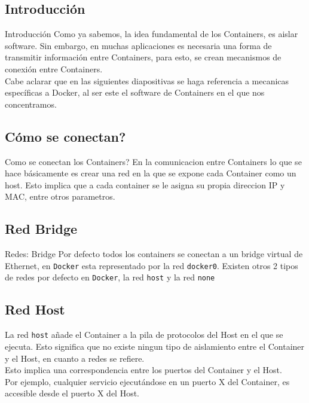 \documentclass{beamer}
\begin{document}
\subsection{Introducción}

\begin{frame}{Introducción}
	Como ya sabemos, la idea fundamental de los Containers, es aislar software. Sin embargo, en muchas aplicaciones es necesaria una forma de transmitir información entre Containers, para esto, se crean mecanismos de conexión entre Containers. \\Cabe aclarar que en las siguientes diapositivas se haga referencia a mecanicas específicas a Docker, al ser este el software de Containers en el que nos concentramos.
\end{frame}

\subsection{Cómo se conectan?}
\begin{frame}{Como se conectan los Containers?}
	En la comunicacion entre Containers lo que se hace básicamente es crear una red en la que se expone cada Container como un host. Esto implica que a cada container se le asigna su propia direccion IP y MAC, entre otros parametros.
\end{frame}

\subsection{Red Bridge}
\begin{frame}{Redes: Bridge}
Por defecto todos los containers se conectan a un bridge virtual de Ethernet, en \texttt{Docker} esta representado por la red \texttt{docker0}. Existen otros 2 tipos de redes por defecto en \texttt{Docker}, la red \texttt{host} y la red \texttt{none}
\end{frame}

\subsection{Red Host}

\begin{frame}
\hspace{1cm} La red \texttt{host} añade el Container a la pila de protocolos del Host en el que se ejecuta. Esto significa que no existe ningun tipo de aislamiento entre el Container y el Host, en cuanto a redes se refiere.\\

\hspace{1cm} Esto implica una correspondencia entre los puertos del Container y el Host. \\

\hspace{1cm} Por ejemplo, cualquier servicio ejecutándose en un puerto X del Container, es accesible desde el puerto X del Host. 
\end{frame}
\end{document}
